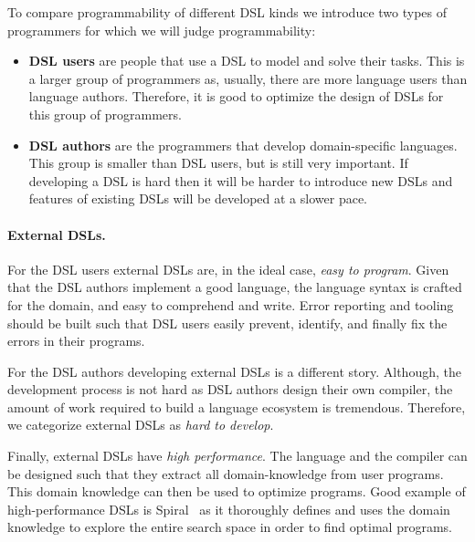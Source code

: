 To compare programmability of different DSL kinds we introduce two types of programmers
 for which we will judge programmability:\begin{itemize}
  \item {\bf DSL users} are people that use a DSL to model and solve their tasks.
   This is a larger group of programmers as, usually, there are more language users
   than language authors. Therefore, it is good to optimize the design of DSLs for
   this group of programmers.

  \item {\bf DSL authors} are the programmers that develop domain-specific languages.
   This group is smaller than DSL users, but is still very important. If developing a
   DSL is hard then it will be harder to introduce new DSLs and features of existing
   DSLs will be developed at a slower pace.
 \end{itemize}

\paragraph{External DSLs.} For the DSL users external DSLs are, in the ideal case, \emph{easy to program}.
 Given that the DSL authors implement a good language, the language syntax is crafted
 for the domain, and easy to comprehend and write. Error reporting and tooling should
 be built such that DSL users easily prevent, identify, and finally fix the errors in
 their programs.

For the DSL authors developing external DSLs is a different story. Although, the development
 process is not hard as DSL authors design their own compiler, the amount of work
 required to build a language ecosystem is tremendous. Therefore, we categorize
 external DSLs as \emph{hard to develop}.

Finally, external DSLs have \emph{high performance}. The language and the compiler can be
 designed such that they extract all domain-knowledge from user programs. This domain knowledge
 can then be used to optimize programs. Good example of high-performance DSLs is
 Spiral~\cite{puschel2005spiral} as it thoroughly defines and uses the domain
 knowledge to explore the entire search space in order to find optimal programs.



